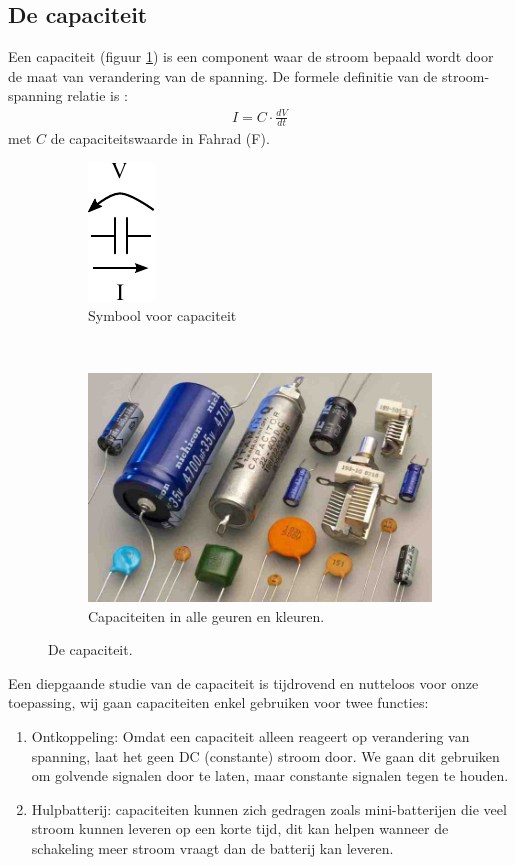 \documentclass{article}
\begin{document}
		\subsection{De capaciteit}
		Een capaciteit (figuur \ref{fig:capaciteit}) is een component waar de stroom bepaald wordt door de maat van verandering van de spanning. De formele definitie van de stroom-spanning relatie is :
		\begin{align}
		    I = C \cdot \frac{dV}{dt}
		\end{align}
		met $C$ de capaciteitswaarde in Fahrad (F). 
		\begin{figure}[htbp!]
			\centering
			\begin{subfigure}[b]{0.45\linewidth}
				\centering
				\includegraphics{cap}
				\caption{Symbool voor capaciteit}
			\end{subfigure}
			~
			\begin{subfigure}[b]{0.45\linewidth}
				\centering
				\includegraphics[scale=0.6]{caps}
				\caption{Capaciteiten in alle geuren en kleuren.}
			\end{subfigure}
		\caption{De capaciteit.}
		\label{fig:capaciteit}
		\end{figure}
		Een diepgaande studie van de capaciteit is tijdrovend en nutteloos voor onze toepassing, wij gaan capaciteiten enkel  gebruiken voor twee functies:
		\begin{enumerate}
			\item Ontkoppeling: Omdat een capaciteit alleen reageert op verandering van spanning, laat het geen DC (constante) stroom door. We gaan dit gebruiken om golvende signalen door te laten, maar constante signalen tegen te houden.
			\item Hulpbatterij: capaciteiten kunnen zich gedragen zoals mini-batterijen die veel stroom kunnen leveren op een korte tijd, dit kan helpen wanneer de schakeling meer stroom vraagt dan de batterij kan leveren.
		\end{enumerate}
\end{document}
